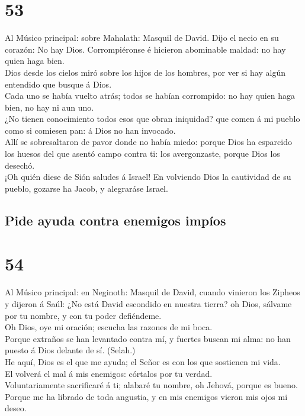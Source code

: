 \hypertarget{section-19-53}{%
\section{53}\label{section-19-53}}

 Al Músico principal: sobre Mahalath: Masquil de David.
Dijo el necio en su corazón: No hay Dios. Corrompiéronse é hicieron
abominable maldad: no hay quien haga bien.\\
 Dios desde los cielos miró sobre los hijos de los
hombres, por ver si hay algún entendido que busque á Dios.\\
 Cada uno se había vuelto atrás; todos se habían
corrompido: no hay quien haga bien, no hay ni aun uno.\\
 ¿No tienen conocimiento todos esos que obran iniquidad?
que comen á mi pueblo como si comiesen pan: á Dios no han invocado.\\
 Allí se sobresaltaron de pavor donde no había miedo:
porque Dios ha esparcido los huesos del que asentó campo contra ti: los
avergonzaste, porque Dios los desechó.\\
 ¡Oh quién diese de Sión saludes á Israel! En volviendo
Dios la cautividad de su pueblo, gozarse ha Jacob, y alegraráse Israel.

\hypertarget{pide-ayuda-contra-enemigos-impuxedos}{%
\subsection{Pide ayuda contra enemigos
impíos}\label{pide-ayuda-contra-enemigos-impuxedos}}

\hypertarget{section-19-54}{%
\section{54}\label{section-19-54}}

 Al Músico principal: en Neginoth: Masquil de David,
cuando vinieron los Zipheos y dijeron á Saúl: ¿No está David escondido
en nuestra tierra? oh Dios, sálvame por tu nombre, y con tu poder
defiéndeme.\\
 Oh Dios, oye mi oración; escucha las razones de mi
boca.\\
 Porque extraños se han levantado contra mí, y fuertes
buscan mi alma: no han puesto á Dios delante de sí. (Selah.)\\
 He aquí, Dios es el que me ayuda; el Señor es con los que
sostienen mi vida.\\
 El volverá el mal á mis enemigos: córtalos por tu
verdad.\\
 Voluntariamente sacrificaré á ti; alabaré tu nombre, oh
Jehová, porque es bueno.\\
 Porque me ha librado de toda angustia, y en mis enemigos
vieron mis ojos mi deseo.

